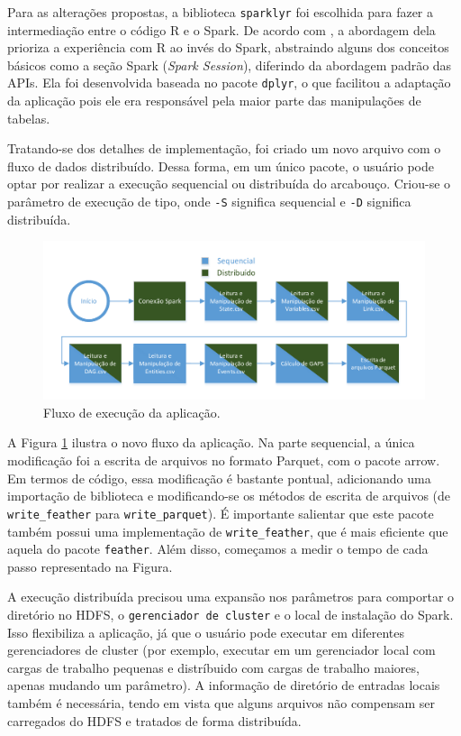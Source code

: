 Para as alterações propostas, a biblioteca \texttt{sparklyr} foi escolhida para fazer a intermediação 
entre o código R e o Spark. De acordo com \citet{}, a abordagem dela prioriza a 
experiência com R ao invés do Spark, abstraindo alguns dos conceitos básicos como a seção Spark
(\emph{Spark Session}), diferindo da abordagem padrão das APIs. Ela foi desenvolvida baseada no pacote \texttt{dplyr},
o que facilitou a adaptação da aplicação pois ele era responsável pela maior parte das manipulações de tabelas.



Tratando-se dos detalhes de implementação, foi criado um novo arquivo com o fluxo de dados distribuído.
Dessa forma, em um único pacote, o usuário pode optar por realizar a execução sequencial ou distribuída do arcabouço.
Criou-se o parâmetro de execução de tipo, onde \texttt{-S} significa sequencial e \texttt{-D} significa distribuída.

\begin{figure}[ht]
 \centerline{\includegraphics[width=1\textwidth]{./img/applicationflow.pdf}}
 \caption{Fluxo de execução da aplicação.}
 \label{fig:spark-starvz-flow}
\end{figure}

A Figura \ref{fig:spark-starvz-flow} ilustra o novo fluxo da aplicação. Na parte sequencial, a 
única modificação foi a escrita de arquivos no formato Parquet, com o pacote arrow. Em termos de código,
essa modificação é bastante pontual, adicionando uma importação de biblioteca e modificando-se
os métodos de escrita de arquivos (de \texttt{write\_feather} para \texttt{write\_parquet}). É 
importante salientar que este pacote também possui uma implementação de \texttt{write\_feather},
que é mais eficiente que aquela do pacote \texttt{feather}. Além disso, começamos a medir o tempo
de cada passo representado na Figura.

A execução distribuída precisou uma expansão nos parâmetros para comportar o diretório no HDFS, 
o \texttt{gerenciador de cluster} e o local de instalação do Spark. Isso flexibiliza a aplicação,
já que o usuário pode executar em diferentes gerenciadores de cluster (por exemplo, executar 
em um gerenciador local com cargas de trabalho pequenas e distríbuido com cargas de trabalho maiores, 
apenas mudando um parâmetro). A informação de diretório de entradas locais também é necessária, 
tendo em vista que alguns arquivos não compensam ser carregados do HDFS e tratados de forma distribuída.




